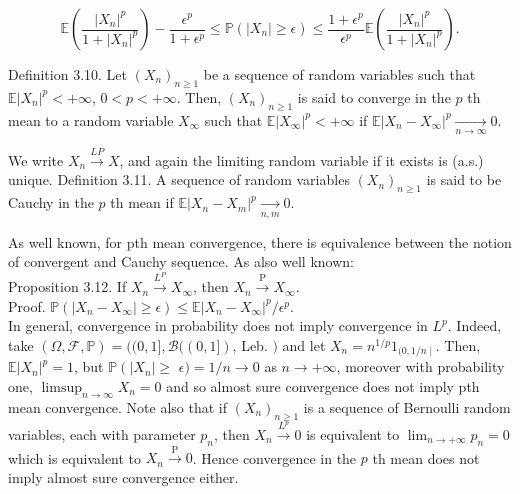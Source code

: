 \documentclass{amsbook}
\theoremstyle{plain}%
\theoremstyle{definition}
\theoremstyle{remark}
\begin{document}
    $$
    \mathbb{E}\left(\frac{\left|X_{n}\right|^{p}}{1+\left|X_{n}\right|^{p}}\right)-\frac{\epsilon^{p}}{1+\epsilon^{p}} \leq \mathbb{P}\left(\left|X_{n}\right| \geq \epsilon\right) \leq \frac{1+\epsilon^{p}}{\epsilon^{p}} \mathbb{E}\left(\frac{\left|X_{n}\right|^{p}}{1+\left|X_{n}\right|^{p}}\right) .
    $$

    Definition 3.10. Let $\left(X_{n}\right)_{n \geq 1}$ be a sequence of random variables such that $\mathbb{E}\left|X_{n}\right|^{p}<+\infty$, $0<p<+\infty$. Then, $\left(X_{n}\right)_{n \geq 1}$ is said to converge in the $p$ th mean to a random variable $X_{\infty}$ such that $\mathbb{E}\left|X_{\infty}\right|^{p}<+\infty$ if $\mathbb{E}\left|X_{n}-X_{\infty}\right|^{p} \underset{n \rightarrow \infty}{\longrightarrow} 0$.

    We write $X_{n} \xrightarrow{L P} X$, and again the limiting random variable if it exists is (a.s.) unique. Definition 3.11. A sequence of random variables $\left(X_{n}\right)_{n \geq 1}$ is said to be Cauchy in the $p$ th mean if $\mathbb{E}\left|X_{n}-X_{m}\right|^{p} \underset{n, m}{\longrightarrow} 0$.

    As well known, for pth mean convergence, there is equivalence between the notion of convergent and Cauchy sequence. As also well known:\\
    Proposition 3.12. If $X_{n} \xrightarrow{L^{P}} X_{\infty}$, then $X_{n} \xrightarrow{\mathrm{P}} X_{\infty}$.\\
    Proof. $\mathbb{P}\left(\left|X_{n}-X_{\infty}\right| \geq \epsilon\right) \leq \mathbb{E}\left|X_{n}-X_{\infty}\right|^{p} / \epsilon^{p}$.\\
    In general, convergence in probability does not imply convergence in $L^{p}$. Indeed, take $(\Omega, \mathcal{F}, \mathbb{P})=((0,1], \mathcal{B}((0,1])$, Leb. $)$ and let $X_{n}=n^{1 / p} 1_{(0,1 / n \mid}$. Then, $\mathbb{E}\left|X_{n}\right|^{p}=1$, but $\mathbb{P}\left(\left|X_{n}\right| \geq\right.$ $\epsilon)=1 / n \rightarrow 0$ as $n \rightarrow+\infty$, moreover with probability one, $\limsup _{n \rightarrow \infty} X_{n}=0$ and so almost sure convergence does not imply pth mean convergence. Note also that if $\left(X_{n}\right)_{n \geq 1}$ is a sequence of Bernoulli random variables, each with parameter $p_{n}$, then $X_{n} \xrightarrow{L^{p}} 0$ is equivalent to $\lim _{n \rightarrow+\infty} p_{n}=0$ which is equivalent to $X_{n} \xrightarrow{\mathrm{P}} 0$. Hence convergence in the $p$ th mean does not imply almost sure convergence either.
\end{document}
